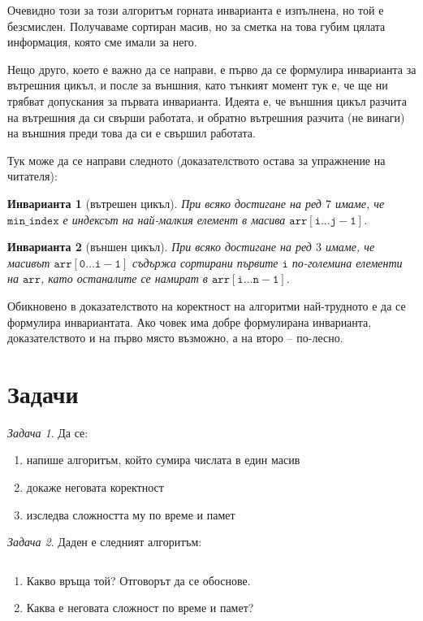 \documentclass{article}
\theoremstyle{definition}
\theoremstyle{plain}
\newtheorem*{invariant}{Инварианта}
\theoremstyle{remark}
\newtheorem{problem}{Задача}
\theoremstyle{definition}
\begin{document}
Очевидно този за този алгоритъм горната инварианта е изпълнена, но той е безсмислен.
Получаваме сортиран масив, но за сметка на това губим цялата информация, която сме имали за него.

Нещо друго, което е важно да се направи, е първо да се формулира инварианта за вътрешния цикъл, и после за външния, като тънкият момент тук е, че ще ни трябват допускания за първата инварианта.
Идеята е, че външния цикъл разчита на вътрешния да си свърши работата, и обратно вътрешния разчита (не винаги) на външния преди това да си е свършил работата.

Тук може да се направи следното (доказателството остава за упражнение на читателя):

\begin{invariant}[вътрешен цикъл]
    При всяко достигане на ред $7$ имаме, че $\mathtt{min\_index}$ е индексът на най-малкия елемент в масива $\mathtt{arr[i \dots j - 1]}$.
\end{invariant}

\begin{invariant}[външен цикъл]
    При всяко достигане на ред $3$ имаме, че масивът $\mathtt{arr[0 \dots i - 1]}$ съдържа сортирани първите $\mathtt{i}$ по-големина елементи на $\mathtt{arr}$, като останалите се намират в $\mathtt{arr[i \dots n - 1]}$.
\end{invariant}

Обикновено в доказателството на коректност на алгоритми най-трудното е да се формулира инвариантата.
Ако човек има добре формулирана инварианта, доказателството и на първо място възможно, а на второ -- по-лесно.

\section*{Задачи}

\begin{problem}
Да се:
\begin{enumerate}
    \item напише алгоритъм, който сумира числата в един масив
    \item докаже неговата коректност
    \item изследва сложността му по време и памет
\end{enumerate}
\end{problem}

\pagebreak

\begin{problem}
Даден е следният алгоритъм:
\inputminted[linenos]{c++}{algorithms/alg.cpp}

\begin{enumerate}
    \item Какво връща той? Отговорът да се обоснове.
    \item Каква е неговата сложност по време и памет?
\end{enumerate}
\end{problem}
\end{document}
